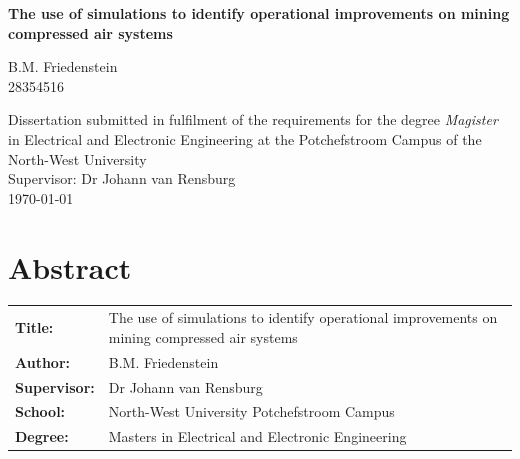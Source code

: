 \documentclass[12pt, english, oneside, open=any]{report}
\begin{document}
	
\begin{titlepage}
	\BgThispage	
		\vspace{0cm}
		\begin{center}
			\textbf{\singlespacing\huge{The use of simulations  to identify operational improvements on mining compressed air systems}\\
			}\par
			\vspace{3cm}
			\LARGE{B.M. Friedenstein \\28354516}\\
		\end{center}
	
	\vspace{2cm}
	
\begin{flushleft}
	{\singlespacing\centering \large Dissertation submitted in fulfilment of the requirements for the degree {\color{blue} \textit{Magister}} in {\color{blue}Electrical and Electronic Engineering} at the Potchefstroom Campus of the North-West University\\
	}
	\vspace{2cm}
	{\large \setlength{\parindent}{0.5cm} Supervisor: Dr Johann van Rensburg \\
	\vspace{1cm}
	\large{\monthyeardate\today}\\		
	}
\end{flushleft}
\end{titlepage}
\clearpage

\section*{Abstract}
	\vspace{0.2cm}
	\thispagestyle{plain}
	\setcounter{page}{2}
	\begin{tabular}{p{2.35cm}p{13cm}}
		\textbf{Title:} & The use of simulations to identify operational improvements on mining compressed air systems  \\
		\textbf{Author:} & B.M. Friedenstein \\
		\textbf{Supervisor:} & Dr Johann van Rensburg \\
		\textbf{School:} & North-West University Potchefstroom Campus\\
		\textbf{Degree:} & Masters in Electrical and Electronic Engineering \\
	\end{tabular}
	\vspace{1cm}
\end{document}
